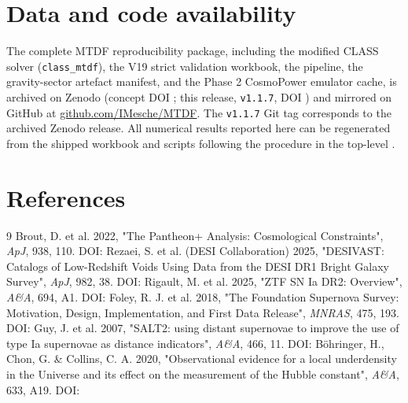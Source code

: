 \documentclass[11pt,a4paper]{article}
\begin{document}
\section{Data and code availability}
The complete MTDF reproducibility package, including the modified CLASS solver
(\texttt{class\_\allowbreak{}mtdf}), the V19 strict validation workbook, the
\texttt{{\small\protect{}}} pipeline, the gravity-sector artefact manifest,
and the Phase 2 CosmoPower emulator cache, is archived on Zenodo
(concept DOI \href{https://doi.org/10.5281/zenodo.19741058}{{\small\protect{}}};
this release, \texttt{v1.1.7}, DOI
\href{https://doi.org/10.5281/zenodo.21525855}{{\small\protect{}}})
and mirrored on GitHub at
\href{https://github.com/IMesche/MTDF}{github.com/\allowbreak{}IMesche/\allowbreak{}MTDF}.
The \texttt{v1.1.7} Git tag corresponds to the archived Zenodo release. All
numerical results reported here can be regenerated from the shipped workbook
and scripts following the procedure in the top-level \texttt{{\small\protect{}}}.

\section{References}
{\scriptsize
\begin{thebibliography}{9}
 Brout, D. et al. 2022, "The Pantheon+ Analysis: Cosmological Constraints", \emph{ApJ}, 938, 110. DOI: \href{https://doi.org/10.3847/1538-4357/ac8e04}{{\small\protect{}}}
 Rezaei, S. et al. (DESI Collaboration) 2025, "DESIVAST: Catalogs of Low-Redshift Voids Using Data from the DESI DR1 Bright Galaxy Survey", \emph{ApJ}, 982, 38. DOI: \href{https://doi.org/10.3847/1538-4357/adb559}{{\small\protect{}}}
 Rigault, M. et al. 2025, "ZTF SN Ia DR2: Overview", \emph{A\&A}, 694, A1. DOI: \href{https://doi.org/10.1051/0004-6361/202450388}{{\small\protect{}}}
 Foley, R. J. et al. 2018, "The Foundation Supernova Survey: Motivation, Design, Implementation, and First Data Release", \emph{MNRAS}, 475, 193. DOI: \href{https://doi.org/10.1093/mnras/stx3136}{{\small\protect{}}}
 Guy, J. et al. 2007, "SALT2: using distant supernovae to improve the use of type Ia supernovae as distance indicators", \emph{A\&A}, 466, 11. DOI: \href{https://doi.org/10.1051/0004-6361:20066930}{{\small\protect{}}}
 B\"ohringer, H., Chon, G. \& Collins, C. A. 2020, "Observational evidence for a local underdensity in the Universe and its effect on the measurement of the Hubble constant", \emph{A\&A}, 633, A19. DOI: \href{https://doi.org/10.1051/0004-6361/201936400}{{\small\protect{}}}
\end{thebibliography}
}
\end{document}
